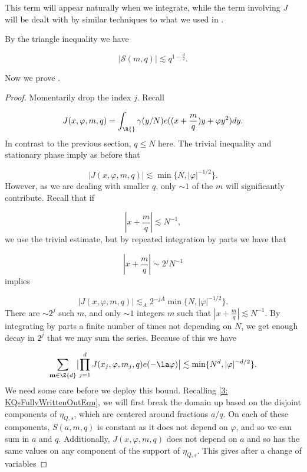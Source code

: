 \documentclass[11pt]{amsart}
\begin{document}
This term will appear naturally when we integrate, while the term involving $J$ will be dealt with by similar techniques to what we used in .

By the triangle inequality we have

\begin{equation}\label{3: S(m,q)TriangleIneqEqn}
    |\mathcal{S}(m,q)|\lesssim q^{1-\frac{d}{2}}.
\end{equation}

Now we prove .
\begin{proof}
Momentarily drop the index $j$. Recall

\begin{equation*}
    J(x,\varphi, m, q) =\int_{\R{}}\gamma(y/N)e((x+\frac{m}{q})y+\varphi y^2)dy.
\end{equation*}
In contrast to the previous section, $q\leq N$ here. The trivial inequality and stationary phase imply as before that

\begin{equation*}
    |J(x,\varphi, m, q)|\lesssim \min \{N,|\varphi|^{-1/2}\}.
\end{equation*}
However, as we are dealing with smaller $q$, only $\sim 1$ of the $m$ will significantly contribute. Recall that if

\begin{equation*}
    |x+\frac{m}{q}|\lesssim N^{-1},
\end{equation*}
we use the trivial estimate, but by repeated integration by parts we have that

\begin{equation*}
    |x+\frac{m}{q}|\sim 2^j N^{-1}
\end{equation*}
implies

\begin{equation*}
    |J(x,\varphi, m, q)|\lesssim_A 2^{-jA} \min \{N,|\varphi|^{-1/2}\}.
\end{equation*}
There are $\sim 2^j$ such $m$, and only $\sim 1$ integers $m$ such that $|x+\frac{m}{q}|\lesssim N^{-1}$. By integrating by parts a finite number of times not depending on $N$, we get enough decay in $2^j$ that we may sum the series. Because of this we have


\begin{equation*}
    \sum_{\mathbf{m}\in\Z{d}}\bigl|\prod_{j=1}^dJ(x_j,\varphi,m_j,q)e(-\la\varphi)\bigr|\lesssim \min\{N^d,|\varphi|^{-d/2}\}.
\end{equation*}
We need some care before we deploy this bound. Recalling \eqref{3: KQsFullyWrittenOutEqn}, we will first break the domain up based on the disjoint components of $\eta_{Q,s}$, which are centered around fractions $a/q$. On each of these components, $S(a,m,q)$ is constant as it does not depend on $\varphi$, and so we can sum in $a$ and $q$. Additionally, $J(x,\varphi,m,q)$ does not depend on $a$ and so has the same values on any component of the support of $\eta_{Q,s}$. This gives after a change of variables


\end{proof}
\end{document}
